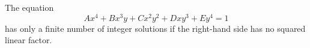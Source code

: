 \begin{proposition}\label{eq:128}
    The equation
\[
    Ax^4+Bx^3y+Cx^2y^2+Dxy^3+Ey^4=1
\]
    has only a finite number of integer solutions if the right-hand side has no squared linear factor.
\end{proposition}
